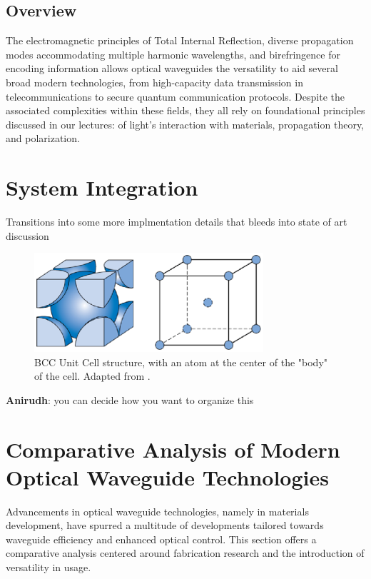 \documentclass[10pt]{article}
\begin{document}
\subsection{Overview}
The electromagnetic principles of Total Internal Reflection, diverse propagation modes accommodating multiple harmonic wavelengths, 
and birefringence for encoding information allows optical waveguides the versatility to aid several broad modern technologies, 
from high-capacity data transmission in telecommunications to secure quantum communication protocols. Despite the associated complexities within these fields, 
they all rely on foundational principles discussed in our lectures: of light's interaction with materials, propagation theory, and polarization.


\section{System Integration}

Transitions into some more implmentation details that bleeds into state of art discussion 


\begin{figure}[h]
    \centering
    \includegraphics[width=8.5cm]{fig1.eps}
    \caption{\label{tab1}BCC Unit Cell structure, with an atom at the center of the "body" of the cell. Adapted from \cite{ref01}.} 
    \end{figure}

\textbf{Anirudh}: you can decide how you want to organize this 

\section{Comparative Analysis of Modern Optical Waveguide Technologies}

Advancements in optical waveguide technologies, namely in materials development, have spurred a multitude of developments tailored towards waveguide efficiency and enhanced optical control. This section offers a comparative analysis centered around fabrication research and the introduction of versatility in usage.
\end{document}
